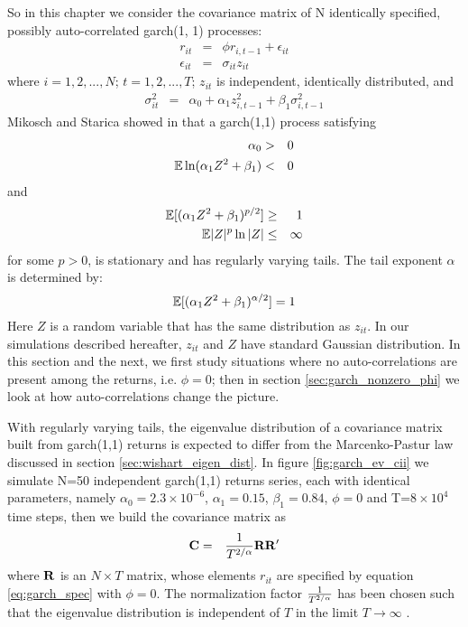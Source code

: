 \documentclass{report}
\begin{document}
So in this chapter we consider the covariance matrix of N
identically specified, possibly auto-correlated \gls{garch}(1, 1)
processes:
\begin{eqnarray}
  r_{it} &=& \phi r_{i, t-1} + \epsilon_{it} \nonumber \\
  \epsilon_{it} &=& \sigma_{it} z_{it} \label{eq:garch_spec}
\end{eqnarray}
where $i=1,2,...,N$; $t=1,2,...,T$; $z_{it}$ is independent,
identically distributed, and
\begin{eqnarray*}
  \sigma_{it}^2 &=& \alpha_0 + \alpha_1 z_{i, t-1}^2 + \beta_1
  \sigma_{i,t-1}^2
\end{eqnarray*}
Mikosch and Starica showed in \cite{mikosch2000} that a
\gls{garch}(1,1) process satisfying
\begin{eqnarray*}
  \alpha_0 &>& 0 \\
  \mathbb{E}\ln(\alpha_1 Z^2 + \beta_1) &<& 0 \\
\end{eqnarray*}
and
\begin{eqnarray*}
  \mathbb{E}[(\alpha_1 Z^2 + \beta_1)^{p/2}] &\geq& 1 \\
  \mathbb{E}|Z|^p \ln|Z| &\leq& \infty
\end{eqnarray*}
for some $p > 0$, is stationary and has regularly varying tails. The
tail exponent $\alpha$ is determined by:
\begin{equation}\label{eq:garch_alpha}
  \mathbb{E}[(\alpha_1 Z^2 + \beta_1)^{\alpha/2}] = 1
\end{equation}
Here $Z$ is a random variable that has the same distribution as
$z_{it}$. In our simulations described hereafter, $z_{it}$ and $Z$
have standard Gaussian distribution. In this section and the next, we
first study situations where no auto-correlations are present among
the returns, i.e. $\phi = 0$; then in section \ref{sec:garch_nonzero_phi} we
look at how auto-correlations change the picture.

With regularly varying tails, the eigenvalue distribution of a
covariance matrix built from \gls{garch}(1,1) returns is expected to
differ from the Marcenko-Pastur law discussed in section
\ref{sec:wishart_eigen_dist}. In figure \ref{fig:garch_ev_cii} we
simulate N=50 independent \gls{garch}(1,1) 
returns series, each with identical parameters, namely $\alpha_0 =
2.3\times 10^{-6}$, $\alpha_1 = 0.15$, $\beta_1 = 0.84$, $\phi = 0$
and T=$8\times10^4$ time steps, then we build the covariance
matrix as
\begin{eqnarray*}
  \mathbf{C} &=& {1 \over T^{2/\alpha}} \mathbf{RR'}
\end{eqnarray*}
where $\mathbf{R}$ is an $N\times T$ matrix, whose elements $r_{it}$ are
specified by equation \ref{eq:garch_spec} with $\phi = 0$. The
normalization factor $1 \over T^{2/\alpha}$ has been chosen such that the
eigenvalue distribution is independent of $T$ in the limit $T \to
\infty$ \cite{politi2010, Cizeau1994}.
\end{document}
